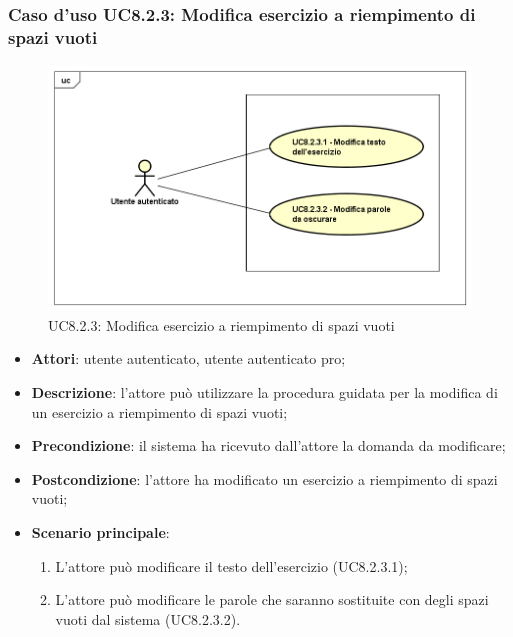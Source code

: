 \subsubsection{Caso d'uso UC8.2.3: Modifica esercizio a riempimento di spazi vuoti}
	\label{UC8.2.3}
	\begin{figure}[h]
		\centering
			\includegraphics[scale=0.45,keepaspectratio]{UML/UC8_2_3.png}
		\caption{UC8.2.3: Modifica esercizio a riempimento di spazi vuoti}
	\end{figure}
	\FloatBarrier
	\begin{itemize}
		\item
			\textbf{Attori}: utente autenticato, utente autenticato pro;
		\item		
			\textbf{Descrizione}: l'attore può utilizzare la procedura guidata per la modifica di un esercizio a riempimento di spazi vuoti;
		\item
			\textbf{Precondizione}: il sistema ha ricevuto dall'attore la domanda da modificare;
		\item
			\textbf{Postcondizione}: l'attore ha modificato un esercizio a riempimento di spazi vuoti;
		\item
			\textbf{Scenario principale}:
	       		\begin{enumerate}
	       			\item
	       			L'attore può modificare il testo dell'esercizio (UC8.2.3.1);
	       			\item
	       			L'attore può modificare le parole che saranno sostituite con degli spazi vuoti dal sistema (UC8.2.3.2).
	 			\end{enumerate}
	\end{itemize}
	
